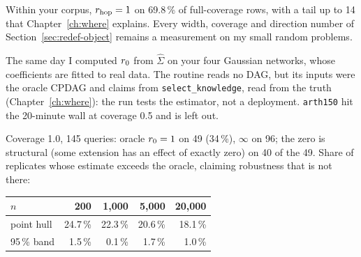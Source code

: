 Within your corpus, $r_{\mathrm{hop}} = 1$ on 69.8\,\% of full-coverage rows, with a tail up to 14 that Chapter~\ref{ch:where} explains. Every width, coverage and direction number of Section~\ref{sec:redef-object} remains a measurement on my small random problems.

The same day I computed $r_{0}$ from $\widehat\Sigma$ on your four Gaussian networks, whose coefficients are fitted to real
data. The routine reads no DAG, but its inputs were the oracle CPDAG and claims from \texttt{select\_knowledge}, read from the
truth (Chapter~\ref{ch:where}): the run tests the estimator, not a deployment. \texttt{arth150} hit the 20-minute wall at coverage 0.5 and is left out.

\begin{medido}
Coverage 1.0, 145 queries: oracle $r_{0} = 1$ on 49 (34\,\%), $\infty$ on 96; the zero is structural (some extension has an
effect of exactly zero) on 40 of the 49. Share of replicates whose estimate exceeds the oracle, claiming robustness that is
not there:

\smallskip
\begin{tabular}{@{}lrrrr@{}}
$n$ & 200 & 1,000 & 5,000 & 20,000 \\ \midrule
point hull & 24.7\,\% & 22.3\,\% & 20.6\,\% & 18.1\,\% \\
95\,\% band & 1.5\,\% & 0.1\,\% & 1.7\,\% & 1.0\,\% \\
\end{tabular}
\end{medido}



